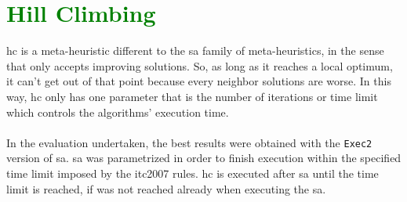 \section{\textcolor{green}{Hill Climbing}}
\label{sec:HillClimbing}

\gls{hc} is a meta-heuristic different to the \gls{sa} family of meta-heuristics, in the sense that only accepts improving solutions. So, as long as it reaches a local optimum, it can't get out of that point because every neighbor solutions are worse. In this way, \gls{hc} only has one parameter that is the number of iterations or time limit which controls the algorithms' execution time.\\
\\
In the evaluation undertaken, the best results were obtained with the \verb+Exec2+ version of \gls{sa}. \gls{sa} was parametrized in order to finish execution within the specified time limit imposed by the \gls{itc2007} rules. \gls{hc} is executed after \gls{sa} until the time limit is reached, if was not reached already when executing the \gls{sa}.

